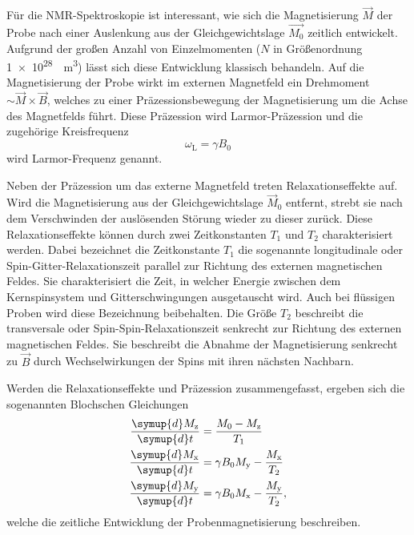 Für die NMR-Spektroskopie ist interessant, wie sich die Magnetisierung $\vec{M}$
der Probe nach einer Auslenkung aus der Gleichgewichtslage $\vec{M_0}$
zeitlich entwickelt.
Aufgrund der großen Anzahl von Einzelmomenten
($N$ in Größenordnung \SI[retain-unity-mantissa=false]{1e28}{\per\cubic\meter})
lässt sich diese Entwicklung klassisch behandeln.
Auf die Magnetisierung der Probe wirkt im externen Magnetfeld ein Drehmoment
$\sim \vec{M} \times \vec{B}$,
welches zu einer Präzessionsbewegung der Magnetisierung um die Achse des
Magnetfelds führt.
Diese Präzession wird Larmor-Präzession und die zugehörige Kreisfrequenz
\begin{equation}
  \omega_\text{L} = \gamma B_0
  \label{eqn:LarmorFrequenz}
\end{equation}
wird Larmor-Frequenz genannt.

Neben der Präzession um das externe Magnetfeld treten Relaxationseffekte auf.
Wird die Magnetisierung aus der Gleichgewichtslage $\vec{M}_0$ entfernt,
strebt sie nach dem Verschwinden der auslösenden Störung wieder zu dieser zurück.
Diese Relaxationseffekte können durch zwei Zeitkonstanten $T_1$ und
$T_2$ charakterisiert werden.
Dabei bezeichnet die Zeitkonstante $T_1$ die sogenannte longitudinale oder
Spin-Gitter-Relaxationszeit parallel zur Richtung des externen magnetischen Feldes.
Sie charakterisiert die Zeit, in welcher Energie zwischen dem Kernspinsystem
und Gitterschwingungen ausgetauscht wird. Auch bei flüssigen Proben wird
diese Bezeichnung beibehalten.
Die Größe $T_2$ beschreibt die transversale oder Spin-Spin-Relaxationszeit
senkrecht zur Richtung des externen magnetischen Feldes.
Sie beschreibt die Abnahme der Magnetisierung senkrecht zu $\vec{B}$
durch Wechselwirkungen der Spins mit ihren nächsten Nachbarn.

Werden die Relaxationseffekte und Präzession zusammengefasst, ergeben sich
die sogenannten Blochschen Gleichungen
\begin{equation}
  \begin{split}
    \frac{\symup{d} M_\text{z}}{\symup{d} t} &= \frac{M_0 - M_\text{z}}{T_1} \\
    \frac{\symup{d} M_\text{x}}{\symup{d} t} &= 
      \gamma B_0 M_\text{y} - \frac{M_\text{x}}{T_2} \\
    \frac{\symup{d} M_\text{y}}{\symup{d} t} &=
      \gamma B_0 M_\text{x} - \frac{M_\text{y}}{T_2},
  \end{split}
  \label{eqn:Bloch-Gleichungen}
\end{equation}
welche die zeitliche Entwicklung der Probenmagnetisierung beschreiben.


